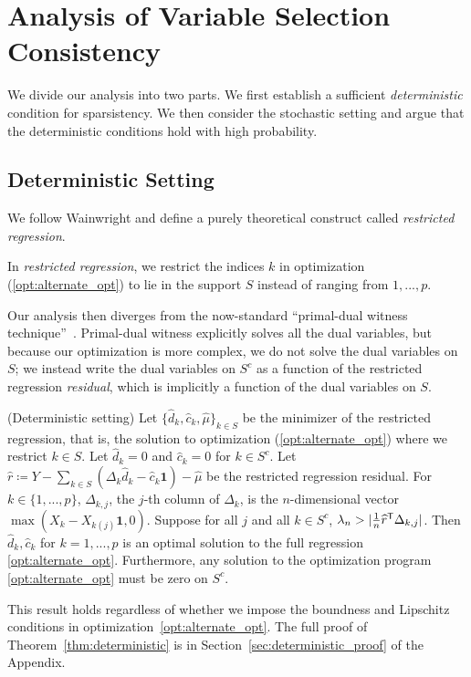 \section{Analysis of Variable Selection Consistency}

We divide our analysis into two parts. We first establish a sufficient
\emph{deterministic} condition for sparsistency.  We then consider the
stochastic setting and argue that the deterministic conditions hold with high probability. 

\subsection{Deterministic Setting}

We follow Wainwright \cite{Wain:09a} and define a purely theoretical construct called \emph{restricted regression}.
\begin{definition}
In \emph{restricted regression}, we restrict the indices $k$ in
optimization (\ref{opt:alternate_opt}) to lie in the support $S$ instead of ranging from $1,...,p$. 
\end{definition}

Our analysis then diverges from the now-standard ``primal-dual witness
technique''~\cite{Wain:09a}. Primal-dual witness explicitly solves all the dual variables, but because our optimization is more complex, we do not solve the dual variables on $S$; we instead write the dual variables on $S^c$ as a function of the restricted regression \emph{residual}, which is implicitly a function of the dual variables on $S$.

\begin{theorem} (Deterministic setting)
\label{thm:deterministic}
Let $\{\hat{d}_k, \hat{c}_k, \hat{\mu} \}_{k \in S}$ be the minimizer of the restricted regression, that is, the solution to optimization (\ref{opt:alternate_opt}) where we restrict $k \in S$. Let $\hat{d}_k = 0$ and $ \hat{c}_k = 0$ for $k \in S^c$.
Let $\hat{r} \coloneqq Y - \sum_{k \in S} (\Delta_k \hat{d}_k -
\hat{c}_k \mathbf{1}) - \hat{\mu}$ be the restricted regression residual. For $k
\in \{1,...,p\}$, $\Delta_{k, j}$, the $j$-th column of $\Delta_k$, is the $n$-dimensional vector $\max( X_k - X_{k (j)} \mathbf{1}, 0)$. 
Suppose for all $j$ and all $k\in S^c$, $\lambda_n > | \frac{1}{n}
\widehat{r}^{\mathsf{T}} \Delta_{k,j}|$. Then $\hat{d}_k, \hat{c}_k$ for $k=1,...,p$ is an optimal solution to the full regression \ref{opt:alternate_opt}. Furthermore, any solution to the optimization program \ref{opt:alternate_opt} must be zero on $S^c$.
\end{theorem}
This result holds regardless of whether we impose the boundness and Lipschitz conditions in optimization~\ref{opt:alternate_opt}.
The full proof of Theorem~\ref{thm:deterministic} is in Section~\ref{sec:deterministic_proof} of the Appendix.

